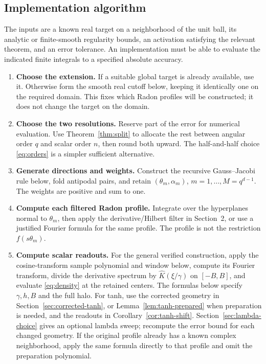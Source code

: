 \documentclass[11pt,letterpaper]{article}
\theoremstyle{definition}
\theoremstyle{remark}
\begin{document}
\subsection{Implementation algorithm}
The inputs are a known real target on a neighborhood of the unit ball, its
analytic or finite-smooth regularity bounds, an activation satisfying the
relevant theorem, and an error tolerance. An implementation must be able to
evaluate the indicated finite integrals to a specified absolute accuracy.
\begin{enumerate}
\item \textbf{Choose the extension.} If a suitable global target is already
available, use it. Otherwise form the smooth real cutoff below, keeping it
identically one on the required domain. This fixes which Radon profiles will
be constructed; it does not change the target on the domain.
\item \textbf{Choose the two resolutions.} Reserve part of the error for
numerical evaluation. Use Theorem~\ref{thm:split} to allocate the rest between
angular order \(q\) and scalar order \(n\), then round both upward. The
half-and-half choice \eqref{eq:orders} is a simpler sufficient alternative.
\item \textbf{Generate directions and weights.} Construct the recursive
Gauss--Jacobi rule below, fold antipodal pairs, and retain
\((\theta_m,\alpha_m)\), \(m=1,\ldots,M=q^{d-1}\).
The weights are positive and sum to one.
\item \textbf{Compute each filtered Radon profile.} Integrate over the
hyperplanes normal to \(\theta_m\), then apply the derivative/Hilbert filter
in Section~2, or use a justified Fourier formula for the same profile.
The profile is not the restriction \(f(s\theta_m)\).
\item \textbf{Compute scalar readouts.} For the general verified construction,
apply the cosine-transform sample polynomial and window below, compute its
Fourier transform, divide the derivative spectrum by
\(\widehat K(\xi/\gamma)\) on \([-B,B]\), and evaluate \eqref{eq:density}
at the retained centers. The formulas below specify \(\gamma,h,B\) and the
full halo. For tanh, use the corrected geometry in
Section~\ref{sec:corrected-tanh}, or Lemma~\ref{lem:tanh-prepared} when
preparation is needed, and the readouts in Corollary~\ref{cor:tanh-shift}.
Section~\ref{sec:lambda-choice} gives an optional lambda sweep; recompute
the error bound for each changed geometry. If the original
profile already has a known complex neighborhood, apply the same formula
directly to that profile and omit the preparation polynomial.

\end{enumerate}
\end{document}
